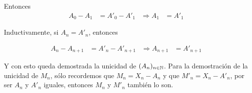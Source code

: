 Entonces
\begin{align}
    A_0 - A_1 &= A'_0 - A'_1 &\Rightarrow A_1 &= A'_1
\end{align}\par\null

Inductivamente, si $A_n = A'_n$, entonces
           
\begin{align}
    A_n - A_{n+1} &= A'_n - A'_{n+1} &\Rightarrow A_{n+1} &= A'_{n+1}
\end{align}                                                                                                         

Y con esto queda demostrada la unicidad de $(A_n)_{n\in\mathbb{N}}$. Para la demostración de la unicidad de $M_n$, sólo recordemos que 
$M_n = X_n - A_n$ y que $M'_n = X_n - A'_n$, por ser $A_n$ y $A'_n$ iguales, entonces $M_n$ y $M'_n$ también lo son.
